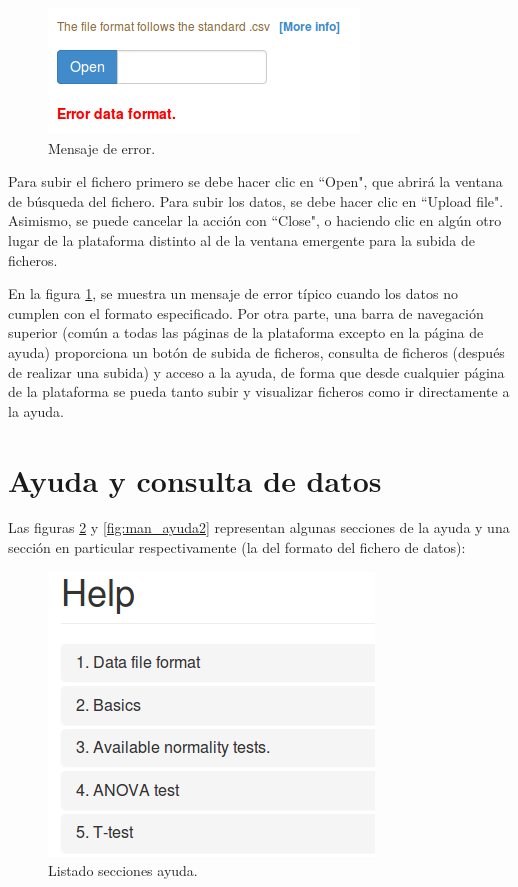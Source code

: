 \begin{figure}[H]
\centering
\includegraphics[scale=0.5]{figuras/man_fichero2.png}
\caption{Mensaje de error.}
\label{fig:man_fichero2}
\end{figure}

Para subir el fichero primero se debe hacer clic en ``Open", que abrirá la ventana de búsqueda del fichero. Para subir los datos, se debe hacer clic en ``Upload file". Asimismo, se puede cancelar la acción con ``Close", o haciendo clic en algún otro lugar de la plataforma distinto al de la ventana emergente para la subida de ficheros.

En la figura \ref{fig:man_fichero2}, se muestra un mensaje de error típico cuando los datos no cumplen con el formato especificado. Por otra parte, una barra de navegación superior (común a todas las páginas de la plataforma excepto en la página de ayuda) proporciona un botón de subida de ficheros, consulta de ficheros (después de realizar una subida) y acceso a la ayuda, de forma que desde cualquier página de la plataforma se pueda tanto subir y visualizar ficheros como ir directamente a la ayuda.

\section{Ayuda y consulta de datos}

Las figuras \ref{fig:man_ayuda1} y \ref{fig:man_ayuda2} representan algunas secciones de la ayuda y una sección en particular respectivamente (la del formato del fichero de datos):

\begin{figure}[H]
\centering
\includegraphics[scale=0.5]{figuras/man_ayuda1.png}
\caption{Listado secciones ayuda.}
\label{fig:man_ayuda1}
\end{figure}

